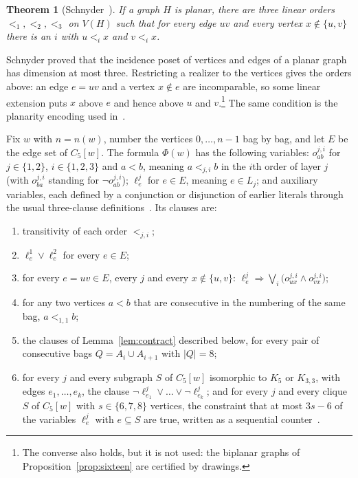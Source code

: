 \documentclass[11pt]{amsart}
\newtheorem{theorem}{Theorem}[section]
\theoremstyle{definition}
\theoremstyle{remark}
\numberwithin{equation}{section}
\newcommand{\cw}{C_5[w]}
\begin{document}
\begin{theorem}[Schnyder~\cite{Sc}]\label{thm:schnyder}
If a graph $H$ is planar, there are three linear orders $<_1,<_2,<_3$ on $V(H)$ such that for every edge $uv$ and every vertex $x\notin\{u,v\}$ there is an $i$ with $u<_ix$ and $v<_ix$.
\end{theorem}

Schnyder proved that the incidence poset of vertices and edges of a planar graph has dimension at most three. Restricting a realizer to the vertices gives the orders above: an edge $e=uv$ and a vertex $x\notin e$ are incomparable, so some linear extension puts $x$ above $e$ and hence above $u$ and $v$.\footnote{The converse also holds, but it is not used: the biplanar graphs of Proposition~\ref{prop:sixteen} are certified by drawings.} The same condition is the planarity encoding used in~\cite{KSS}.

Fix $w$ with $n=n(w)$, number the vertices $0,\dots,n-1$ bag by bag, and let $E$ be the edge set of $\cw$. The formula $\Phi(w)$ has the following variables: $o^{j,i}_{ab}$ for $j\in\{1,2\}$, $i\in\{1,2,3\}$ and $a<b$, meaning $a<_{j,i}b$ in the $i$th order of layer $j$ (with $o^{j,i}_{ba}$ standing for $\neg o^{j,i}_{ab}$); $\ell^j_e$ for $e\in E$, meaning $e\in L_j$; and auxiliary variables, each defined by a conjunction or disjunction of earlier literals through the usual three-clause definitions~\cite{Ts}. Its clauses are:
\begin{enumerate}[label=\textup{(E\arabic*)},leftmargin=*]
\item transitivity of each order $<_{j,i}$;
\item $\ell^1_e\vee\ell^2_e$ for every $e\in E$;
\item for every $e=uv\in E$, every $j$ and every $x\notin\{u,v\}$: $\ell^j_e\Rightarrow\bigvee_{i}\bigl(o^{j,i}_{ux}\wedge o^{j,i}_{vx}\bigr)$;
\item for any two vertices $a<b$ that are consecutive in the numbering of the same bag, $a<_{1,1}b$;
\item the clauses of Lemma~\ref{lem:contract} described below, for every pair of consecutive bags $Q=A_i\cup A_{i+1}$ with $|Q|=8$;
\item for every $j$ and every subgraph $S$ of $\cw$ isomorphic to $K_5$ or $K_{3,3}$, with edges $e_1,\dots,e_k$, the clause $\neg\ell^j_{e_1}\vee\dots\vee\neg\ell^j_{e_k}$; and for every $j$ and every clique $S$ of $\cw$ with $s\in\{6,7,8\}$ vertices, the constraint that at most $3s-6$ of the variables $\ell^j_e$ with $e\subseteq S$ are true, written as a sequential counter~\cite{Si}.
\end{enumerate}
\end{document}
